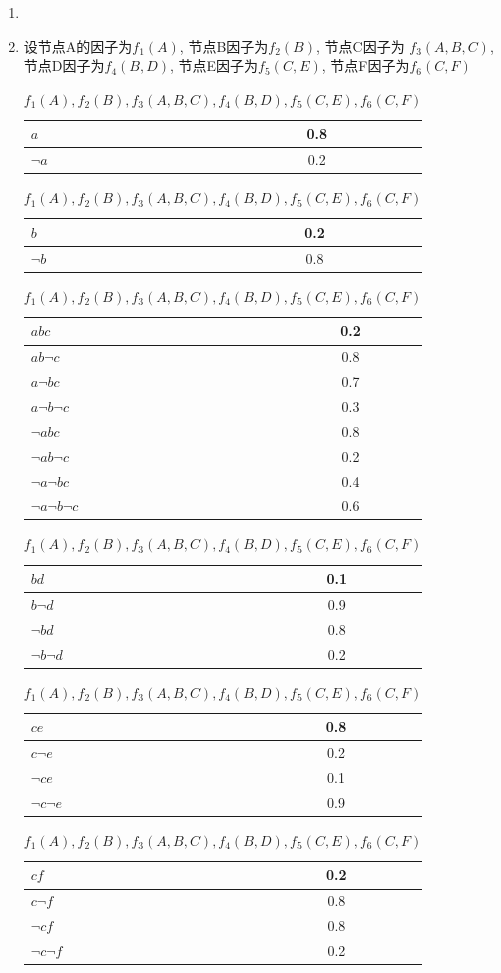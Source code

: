 \documentclass[a4paper, 11pt]{article}
\begin{document}
\begin{enumerate}
  \item

  \item
  设节点A的因子为$f_{1}(A)$, 节点B因子为$f_{2}(B)$, 节点C因子为
  $f_{3}(A,B,C)$, 节点D因子为$f_{4}(B,D)$, 节点E因子为$f_{5}(C,E)$,
  节点F因子为$f_{6}(C,F)$\\
  \begin{table}[ht]
    \centering
    \begin{tabular}{|l|c|}
      \hline
      $a$&0.8\\
      \hline
      $\lnot a$&0.2\\
      \hline
    \end{tabular}
    \begin{tabular}{|l|c|}
      \hline
      $b$&0.2\\
      \hline
      $\lnot b$&0.8\\
      \hline
    \end{tabular}
    \begin{tabular}{|l|c|}
      \hline
      $abc$&0.2\\
      \hline
      $ab\lnot c$&0.8\\
      \hline
      $a\lnot bc$&0.7\\
      \hline
      $a\lnot b \lnot c$&0.3\\
      \hline
      $\lnot abc$&0.8\\
      \hline
      $\lnot ab\lnot c$&0.2\\
      \hline
      $\lnot a \lnot bc$&0.4\\
      \hline
      $\lnot a \lnot b \lnot c$&0.6\\
      \hline
    \end{tabular}
    \begin{tabular}{|l|c|}
      \hline
      $bd$&0.1\\
      \hline
      $b\lnot d$&0.9\\
      \hline
      $\lnot bd$&0.8\\
      \hline
      $\lnot b\lnot d$&0.2\\
      \hline
    \end{tabular}
    \begin{tabular}{|l|c|}
      \hline
      $ce$&0.8\\
      \hline
      $c\lnot e$&0.2\\
      \hline
      $\lnot ce$&0.1\\
      \hline
      $\lnot c\lnot e$&0.9\\
      \hline
    \end{tabular}
    \begin{tabular}{|l|c|}
      \hline
      $cf$&0.2\\
      \hline
      $c\lnot f$&0.8\\
      \hline
      $\lnot cf$&0.8\\
      \hline
      $\lnot c\lnot f$&0.2\\
      \hline
    \end{tabular}
    \caption{$f_{1}(A),f_{2}(B),f_{3}(A,B,C),f_{4}(B,D),f_{5}(C,E),f_{6}(C,F)$}
  \end{table}


\end{enumerate}
\end{document}
